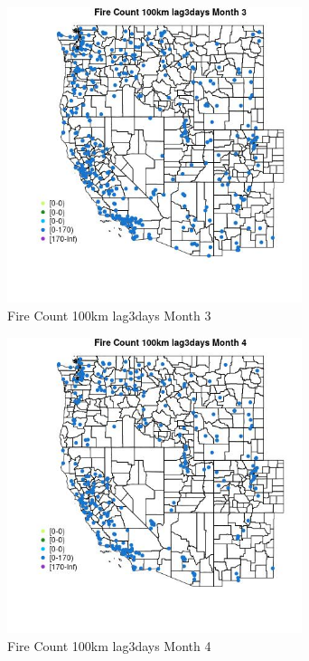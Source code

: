 \begin{figure} 
\centering  
\includegraphics[width=0.77\textwidth]{Code_Outputs/Report_ML_input_PM25_Step4_part_e_de_duplicated_aves_compiled_2019-05-18wNAs_MapObsMo3Fire_Count_100km_lag3days.jpg} 
\caption{\label{fig:Report_ML_input_PM25_Step4_part_e_de_duplicated_aves_compiled_2019-05-18wNAsMapObsMo3Fire_Count_100km_lag3days}Fire Count 100km lag3days Month 3} 
\end{figure} 
 

\begin{figure} 
\centering  
\includegraphics[width=0.77\textwidth]{Code_Outputs/Report_ML_input_PM25_Step4_part_e_de_duplicated_aves_compiled_2019-05-18wNAs_MapObsMo4Fire_Count_100km_lag3days.jpg} 
\caption{\label{fig:Report_ML_input_PM25_Step4_part_e_de_duplicated_aves_compiled_2019-05-18wNAsMapObsMo4Fire_Count_100km_lag3days}Fire Count 100km lag3days Month 4} 
\end{figure} 
 

